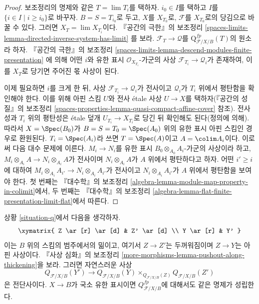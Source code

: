 \begin{proof}
보조정리의 명제와 같은 $T = \lim T_i$를 택하자.
$i_0 \in I$를 택하고 $I$를 $\{i \in I \mid i \geq i_0\}$로 바꾸자.
$B = S = T_{i_0}$로 두고, $X$를 $X_{T_0}$로, $\mathcal{F}$를
$X_{T_0}$로의 당김으로 바꿀 수 있다. 그러면
$X_T = \lim X_{T_i}$이다. 『공간의 극한』의 보조정리
\ref{spaces-limits-lemma-directed-inverse-system-has-limit}
를 보라. $\mathcal{F}_T \to \mathcal{Q}$를
$\text{Q}^{fp}_{\mathcal{F}/X/B}(T)$의 원소라 하자.
『공간의 극한』의 보조정리
\ref{spaces-limits-lemma-descend-modules-finite-presentation}
에 의해 어떤 $i$와 유한 표시 $\mathcal{O}_{X_{T_i}}$-가군의 사상
$\mathcal{F}_{T_i} \to \mathcal{Q}_i$가 존재하여, 이를 $X_T$로 당기면
주어진 몫 사상이 된다.

\medskip\noindent
이제 필요하면 $i$를 크게 한 뒤, 사상
$\mathcal{F}_{T_i} \to \mathcal{Q}_i$가 전사이고 $\mathcal{Q}_i$가
$T_i$ 위에서 평탄함을 확인해야 한다. 이를 위해 아핀 스킴 $U$와
전사 \'etale 사상 $U \to X$를 택하자(『공간의 성질』의 보조정리
\ref{spaces-properties-lemma-quasi-compact-affine-cover} 참조).
전사성과 $T_i$ 위의 평탄성은 \'etale 덮개
$U_{T_i} \to X_{T_i}$로 당긴 뒤 확인해도 된다(정의에 의해).
따라서 $X = \Spec(B_0)$가 $B = S = T_0 = \Spec(A_0)$ 위의 유한 표시
아핀 스킴인 경우로 환원된다. $T_i = \Spec(A_i)$라 쓰면
$T = \Spec(A)$이고 $A = \colim A_i$이다. 이로써 다음 대수 문제에
이른다. $M_i \to N_i$를 유한 표시
$B_0 \otimes_{A_0} A_i$-가군의 사상이라 하고,
$M_i \otimes_{A_i} A \to N_i \otimes_{A_i} A$가 전사이며
$N_i \otimes_{A_i} A$가 $A$ 위에서 평탄하다고 하자. 어떤 $i' \geq i$에
대하여 $M_i \otimes_{A_i} A_{i'} \to N_i \otimes_{A_i} A_{i'}$가 전사이고
$N_i \otimes_{A_i} A_{i'}$가 $A$ 위에서 평탄함을 보여야 한다.
첫 번째는 『대수학』의 보조정리
\ref{algebra-lemma-module-map-property-in-colimit}에서, 두 번째는
『대수학』의 보조정리
\ref{algebra-lemma-flat-finite-presentation-limit-flat}에서 따른다.
\end{proof}

\begin{lemma}
\label{lemma-q-RS-star}
상황 \ref{situation-q}에서 다음을 생각하자.
$$
\xymatrix{
Z \ar[r] \ar[d] & Z' \ar[d] \\
Y \ar[r] & Y'
}
$$
이는 $B$ 위의 스킴의 범주에서의 밂이고, 여기서 $Z \to Z'$는 두꺼워짐이며
$Z \to Y$는 아핀 사상이다. 『사상 심화』의 보조정리
\ref{more-morphisms-lemma-pushout-along-thickening}을 보라.
그러면 자연스러운 사상
$$
Q_{\mathcal{F}/X/B}(Y') \longrightarrow
Q_{\mathcal{F}/X/B}(Y) \times_{Q_{\mathcal{F}/X/B}(Z)} Q_{\mathcal{F}/X/B}(Z')
$$
은 전단사이다. $X \to B$가 국소 유한 표시이면
$Q^{fp}_{\mathcal{F}/X/B}$에 대해서도 같은 명제가 성립한다.
\end{lemma}

